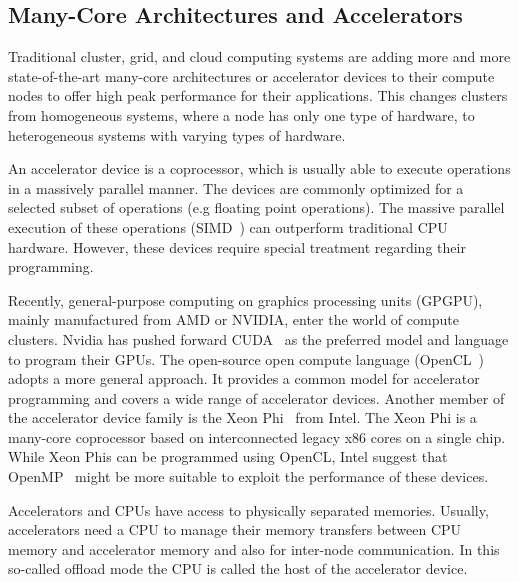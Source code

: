 \subsection{Many-Core Architectures and Accelerators}
\label{sec:accel}

Traditional cluster, grid, and cloud computing systems are adding more
and more state-of-the-art many-core architectures or accelerator
devices to their compute nodes to offer high peak performance for
their applications. This changes clusters from homogeneous systems,
where a node has only one type of hardware, to heterogeneous systems
with varying types of hardware.

An accelerator device is a coprocessor, which is usually
able to execute operations in a massively parallel manner.  The
devices are commonly optimized for a selected subset of operations
(e.g floating point operations). The massive parallel execution of
these operations (SIMD~\cite{Flynn:1972:COE:1952456.1952459}) can outperform traditional CPU hardware.
However, these devices require special treatment regarding
their programming.

Recently, general-purpose computing on graphics processing units
(GPGPU), mainly manufactured from AMD or NVIDIA, enter the world of
compute clusters. Nvidia has pushed forward CUDA~\cite{ref:cuda} as
the preferred model and language to program their GPUs. The
open-source open compute language (OpenCL~\cite{ref:opencl}) adopts a
more general approach.  It provides a common model for accelerator
programming and covers a wide range of accelerator devices.  Another
member of the accelerator device family is the Xeon
Phi~\cite{ref:xeon_phi} from Intel. The Xeon Phi is a many-core
coprocessor based on interconnected legacy x86 cores on a single
chip. While Xeon Phis can be programmed using OpenCL, Intel suggest
that OpenMP~\cite{ref:openmp} might be more suitable to exploit the
performance of these devices.

Accelerators and CPUs have access to physically separated memories.
Usually, accelerators need a CPU to manage their memory
transfers between CPU memory and accelerator memory and also for inter-node
communication. In this so-called offload mode the
CPU is called the host of the accelerator device.

